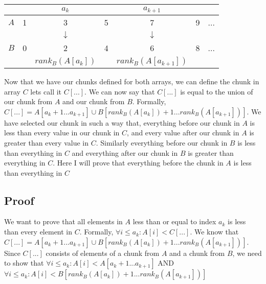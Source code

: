 \documentclass[11pt]{article}
\begin{document}
\begin{center}
\begin{tabular}{ |c|c|c|c|c|c|c| }
  \multicolumn{1}{c}{} &
  \multicolumn{1}{c}{} &
  \multicolumn{1}{c}{$a_k$} &
  \multicolumn{1}{c}{} &
  \multicolumn{1}{c}{$a_{k+1}$} &
  \multicolumn{1}{c}{} &
  \multicolumn{1}{c}{}\\
\hline
 $A$ & 1 & 3 & 5 & 7 & 9 & ... \\
 \hline
  \multicolumn{1}{c}{} &
  \multicolumn{1}{c}{} &
  \multicolumn{1}{c}{$\downarrow$} &
  \multicolumn{1}{c}{} &
  \multicolumn{1}{c}{$\downarrow$} &
  \multicolumn{1}{c}{} &
  \multicolumn{1}{c}{} \\
 \hline
 $B$ & 0 & 2 & 4 & 6 & 8 & ... \\
 \hline
 \multicolumn{1}{c}{} &
 \multicolumn{1}{c}{} &
 \multicolumn{1}{c}{$rank_B(A[a_k])$} &
 \multicolumn{1}{c}{} &
 \multicolumn{1}{c}{ $rank_B(A[a_{k+1}])$ }&
 \multicolumn{1}{c}{} &
 \multicolumn{1}{c}{} \\

\end{tabular}
\end{center}

Now that we have our chunks defined for both arrays, we can define the chunk in array $C$ lets call it $C[...]$. We can now say that $C[...]$ is equal to the union of our chunk from $A$ and our chunk from $B$. Formally,
$C[...] = A[a_k+1 ... a_{k+1}] \cup B[rank_B(A[a_k])+1 ... rank_B(A[a_{k+1}])]$. We have selected our chunk in such a way that, everything before our chunk in $A$ is less than every value in our chunk in $C$, and every value after our chunk in $A$ is greater than every value in $C$. Similarly everything before our chunk in $B$ is less than everything in $C$ and everything after our chunk in $B$ is greater than everything in $C$. Here I will prove that everything before the chunk in $A$ is less than everything in $C$

\subsection{Proof}
We want to prove that all elements in $A$ less than or equal to index $a_k$ is less than every element in $C$. Formally,  $\forall i \leq a_k : A[i] < C[...]$. We know that $C[...] = A[a_k+1 ... a_{k+1}] \cup B[rank_B(A[a_k])+1 ... rank_B(A[a_{k+1}])]$. Since $C[...]$ consists of elements of a chunk from $A$ and a chunk from $B$, we need to show that $\forall i \leq a_k : A[i] < A[a_k+1 ... a_{k+1}]$ AND $\forall i \leq a_k : A[i] < B[rank_B(A[a_k])+1 ... rank_B(A[a_{k+1}])]$
\end{document}
